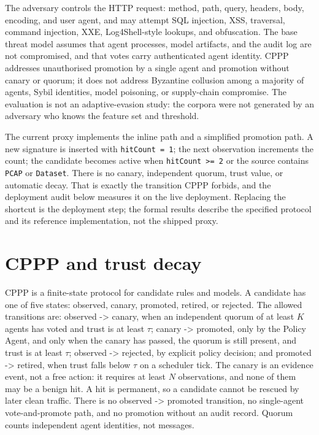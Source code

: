 \documentclass[preprint,11pt]{elsarticle}
\begin{document}
The adversary controls the HTTP request: method, path, query, headers,
body, encoding, and user agent, and may attempt SQL injection, XSS,
traversal, command injection, XXE, Log4Shell-style lookups, and
obfuscation. The base threat model assumes that agent processes, model
artifacts, and the audit log are not compromised, and that votes carry
authenticated agent identity. CPPP addresses unauthorised promotion by a
single agent and promotion without canary or quorum; it does not address
Byzantine collusion among a majority of agents, Sybil identities, model
poisoning, or supply-chain compromise. The evaluation is not an
adaptive-evasion study: the corpora were not generated by an adversary
who knows the feature set and threshold.

The current proxy implements the inline path and a simplified promotion
path. A new signature is inserted with \texttt{hit\allowbreak{}Count\ =\ 1}; the next
observation increments the count; the candidate becomes active when
\texttt{hitCount\ \textgreater{}=\ 2} or the source contains
\texttt{PCAP} or \texttt{Dataset}. There is no canary, independent
quorum, trust value, or automatic decay. That is exactly the transition
CPPP forbids, and the deployment audit below measures it on the live
deployment. Replacing the shortcut is the deployment step; the formal
results describe the specified protocol and its reference
implementation, not the shipped proxy.

\section{CPPP and trust decay}\label{cppp-and-trust-decay}

CPPP is a finite-state protocol for candidate rules and models. A
candidate has one of five states: observed, canary, promoted, retired,
or rejected. The allowed transitions are: observed -\textgreater{}
canary, when an independent quorum of at least \(K\) agents has voted
and trust is at least \(\tau\); canary -\textgreater{} promoted, only by
the Policy Agent, and only when the canary has passed, the quorum is
still present, and trust is at least \(\tau\); observed -\textgreater{}
rejected, by explicit policy decision; and promoted -\textgreater{}
retired, when trust falls below \(\tau\) on a scheduler tick. The canary
is an evidence event, not a free action: it requires at least \(N\)
observations, and none of them may be a benign hit. A hit is permanent,
so a candidate cannot be rescued by later clean traffic. There is no
observed -\textgreater{} promoted transition, no single-agent
vote-and-promote path, and no promotion without an audit record. Quorum
counts independent agent identities, not messages.
\end{document}

